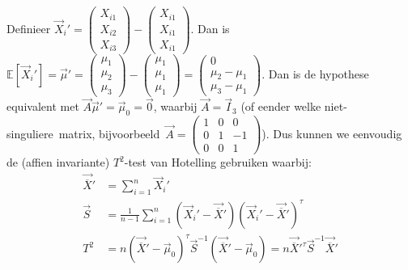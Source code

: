 \documentclass[a4paper,dutch,11pt,]{scrartcl}
\begin{document}
Definieer $\vec{X}_i' = \begin{pmatrix} X_{i1} \\ X_{i2} \\ X_{i3}\end{pmatrix} - \begin{pmatrix} X_{i1} \\ X_{i1} \\ X_{i1}\end{pmatrix}$. Dan is $\mathds{E}[\vec{X}_i']=\vec{\mu}' = \begin{pmatrix} \mu_1 \\ \mu_2 \\ \mu_3\end{pmatrix} - \begin{pmatrix} \mu_1 \\ \mu_1 \\ \mu_1\end{pmatrix} = \begin{pmatrix} 0\\ \mu_2 - \mu_1 \\ \mu_3 - \mu_1\end{pmatrix}$. 
Dan is de hypothese equivalent met $\vec{A} \vec{\mu}' = \vec{\mu}_0 = \vec{0}$, waarbij $\vec{A}=\vec{I}_3$ (of eender welke \mbox{niet-singuliere~matrix}, bijvoorbeeld~$\vec{A} =  \begin{pmatrix}  1 & 0 & 0 \\0 & 1 & -1 \\ 0 & 0 & 1\end{pmatrix}$).
Dus kunnen we eenvoudig de (affien invariante) $T^2$-test van Hotelling gebruiken waarbij:
\begin{align*}
 \vec{\overline{X}}' &= \sum_{i=1}^n \vec{X}_i'\\
 \vec{S} &= \frac{1}{n-1} \sum_{i=1}^{n} (\vec{X}_i' - \vec{\overline{X}}')(\vec{X}_i' - \vec{\overline{X}}')^\tau\\
 T^2 &= n (\vec{\overline{X}}' - \vec{\mu}_0)^\tau \vec{S}^{-1} (\vec{\overline{X}}' - \vec{\mu}_0) = n \vec{\overline{X}}'^\tau \vec{S}^{-1} \vec{\overline{X}}'
\end{align*}
\end{document}
